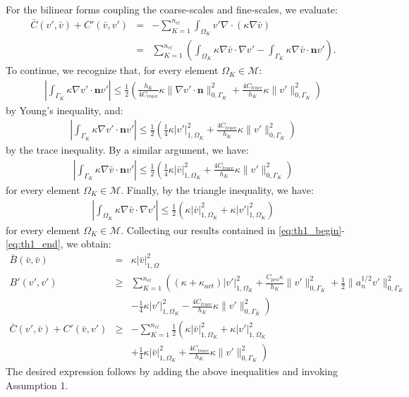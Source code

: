 \documentclass[11pt]{article}
\newenvironment{proof}[1][Proof]{\begin{trivlist}
\item[\hskip \labelsep {\bfseries #1}]}{\end{trivlist}}
\newcommand{\qed}{\nobreak \ifvmode \relax \else
      \ifdim\lastskip<1.5em \hskip-\lastskip
      \hskip1.5em plus0em minus0.5em \fi \nobreak
      \vrule height0.75em width0.5em depth0.25em\fi}
\begin{document}
\begin{proof}
For the bilinear forms coupling the coarse-scales and fine-scales, we evaluate:
\begin{eqnarray}
\bar{C}(v',\bar{v}) + C'(\bar{v},v') & = & -\sum_{K=1}^{n_{el}} \int_{\Omega_K} v' \nabla \cdot \left( \kappa \nabla \bar{v} \right) \nonumber \\
& = & \sum_{K=1}^{n_{el}} \left( \int_{\Omega_K} \kappa \nabla \bar{v} \cdot \nabla v' - \int_{\Gamma_K} \kappa \nabla \bar{v} \cdot \bm{n} v' \right).
\end{eqnarray}
To continue, we recognize that, for every element $\Omega_K \in \mathcal{M}$:
\begin{eqnarray}
\left|\int_{\Gamma_K} \kappa \nabla v' \cdot \bm{n} v' \right| \leq \frac{1}{2} \left( \frac{h_K}{4 C_{trace}} \kappa \| \nabla v' \cdot \bm{n} \|^2_{0,\Gamma_K} + \frac{4 C_{trace}}{h_K} \kappa \| v' \|^2_{0,\Gamma_K}  \right) \nonumber
\end{eqnarray}
by Young's inequality, and:
\begin{eqnarray}
\left|\int_{\Gamma_K} \kappa \nabla v' \cdot \bm{n} v' \right| \leq \frac{1}{2} \left( \frac{1}{4} \kappa | v' |^2_{1,\Omega_K} + \frac{4 C_{trace}}{h_K} \kappa \| v' \|^2_{0,\Gamma_K} \right)
\end{eqnarray}
by the trace inequality.  By a similar argument, we have:
\begin{eqnarray}
\left|\int_{\Gamma_K} \kappa \nabla \bar{v} \cdot \bm{n} v' \right| \leq \frac{1}{2} \left( \frac{1}{4} \kappa | \bar{v} |^2_{1,\Omega_K} + \frac{4 C_{trace}}{h_K} \kappa \| v' \|^2_{0,\Gamma_K} \right)
\end{eqnarray}
for every element $\Omega_K \in \mathcal{M}$.  Finally, by the triangle inequality, we have:
\begin{eqnarray}
\left| \int_{\Omega_K} \kappa \nabla \bar{v} \cdot \nabla v' \right| \leq \frac{1}{2} \left( \kappa | \bar{v} |^2_{1,\Omega_K} + \kappa | v' |^2_{1,\Omega_K} \right) \label{eq:th1_end}
\end{eqnarray}
for every element $\Omega_K \in \mathcal{M}$.  Collecting our results contained in \eqref{eq:th1_begin}-\eqref{eq:th1_end}, we obtain:
\begin{eqnarray}
\bar{B}(\bar{v},\bar{v}) & = & \kappa | \bar{v} |^2_{1,\Omega} \\
B'(v',v') & \geq & \sum_{K=1}^{n_{el}} \left( \left( \kappa + \kappa_{art} \right) | v' |^2_{1,\Omega_K} + \frac{C_{pen}\kappa}{h_K} \| v' \|^2_{0,\Gamma_K} + \frac{1}{2} \| a_n^{1/2} v' \|^2_{0,\Gamma_K} \right. \nonumber \\ && \left. - \frac{1}{4} \kappa | v' |^2_{1,\Omega_K} - \frac{4 C_{trace}}{h_K} \kappa \| v' \|^2_{0,\Gamma_K} \right) \\
\bar{C}(v',\bar{v}) + C'(\bar{v},v') & \geq & - \sum_{K=1}^{n_{el}} \frac{1}{2} \left( \kappa | \bar{v} |^2_{1,\Omega_K} + \kappa | v' |^2_{1,\Omega_K} \right. \nonumber \\ && \left. + \frac{1}{4} \kappa | \bar{v} |^2_{1,\Omega_K} + \frac{4 C_{trace}}{h_K} \kappa \| v' \|^2_{0,\Gamma_K} \right)
\end{eqnarray}
The desired expression follows by adding the above inequalities and invoking Assumption 1. \qed
\end{proof}
\end{document}
